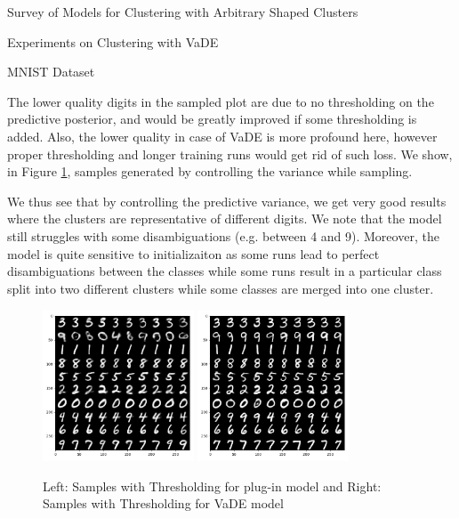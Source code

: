 \documentclass{article}
\begin{document}
\begin{psection}{Survey of Models for Clustering with Arbitrary Shaped Clusters}
\begin{psubsection}{Experiments on Clustering with VaDE}
\begin{pssubsection}{MNIST Dataset}
			\begin{remark}
				The lower quality digits in the sampled plot are due to no thresholding on the predictive posterior, and would be greatly improved if some thresholding is added. Also, the lower quality in case of VaDE is more profound here, however proper thresholding and longer training runs would get rid of such loss. We show, in Figure \ref{fig:thresholded-sampling}, samples generated by controlling the variance while sampling.
				
				We thus see that by controlling the predictive variance, we get very good results where the clusters are representative of different digits. We note that the model still struggles with some disambiguations (e.g. between 4 and 9). Moreover, the model is quite sensitive to initializaiton as some runs lead to perfect disambiguations between the classes while some runs result in a particular class split into two different clusters while some classes are merged into one cluster.
			\end{remark}
			
			\begin{figure}
			    \centering
			    \includegraphics[width=0.4\textwidth]{includes/plots/mnist/sample-thresh-initial.png}
			    \hspace{0.5cm}
			    \includegraphics[width=0.4\textwidth]{includes/plots/mnist/sample-thresh-final.png}
			    \caption{Left: Samples with Thresholding for plug-in model and Right: Samples with Thresholding for VaDE model}
			    \label{fig:thresholded-sampling}
			\end{figure}


\end{pssubsection}
\end{psubsection}
\end{psection}
\end{document}
